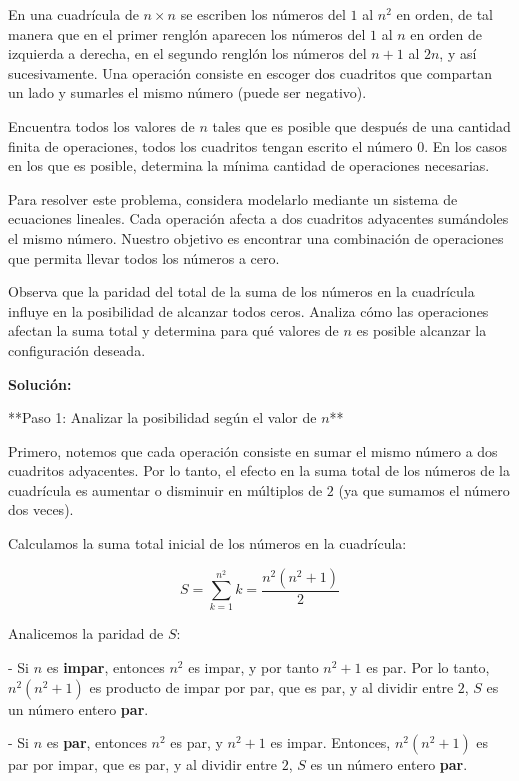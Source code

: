 \documentclass[11pt]{scrartcl}
\begin{document}
\begin{problem}
En una cuadrícula de $n \times n$ se escriben los números del $1$ al $n^2$ en orden, de tal manera que en el primer renglón aparecen los números del $1$ al $n$ en orden de izquierda a derecha, en el segundo renglón los números del $n+1$ al $2n$, y así sucesivamente. Una operación consiste en escoger dos cuadritos que compartan un lado y sumarles el mismo número (puede ser negativo). 

Encuentra todos los valores de $n$ tales que es posible que después de una cantidad finita de operaciones, todos los cuadritos tengan escrito el número 0. En los casos en los que es posible, determina la mínima cantidad de operaciones necesarias.

\begin{hint}
Para resolver este problema, considera modelarlo mediante un sistema de ecuaciones lineales. Cada operación afecta a dos cuadritos adyacentes sumándoles el mismo número. Nuestro objetivo es encontrar una combinación de operaciones que permita llevar todos los números a cero.

Observa que la paridad del total de la suma de los números en la cuadrícula influye en la posibilidad de alcanzar todos ceros. Analiza cómo las operaciones afectan la suma total y determina para qué valores de $n$ es posible alcanzar la configuración deseada.

\begin{solu}
\textbf{Solución:}

**Paso 1: Analizar la posibilidad según el valor de $n$**

Primero, notemos que cada operación consiste en sumar el mismo número a dos cuadritos adyacentes. Por lo tanto, el efecto en la suma total de los números de la cuadrícula es aumentar o disminuir en múltiplos de $2$ (ya que sumamos el número dos veces).

Calculamos la suma total inicial de los números en la cuadrícula:

$$
S = \sum_{k=1}^{n^2} k = \frac{n^2(n^2 + 1)}{2}
$$

Analicemos la paridad de $S$:

- Si $n$ es \textbf{impar}, entonces $n^2$ es impar, y por tanto $n^2 + 1$ es par. Por lo tanto, $n^2(n^2 + 1)$ es producto de impar por par, que es par, y al dividir entre $2$, $S$ es un número entero \textbf{par}.

- Si $n$ es \textbf{par}, entonces $n^2$ es par, y $n^2 + 1$ es impar. Entonces, $n^2(n^2 + 1)$ es par por impar, que es par, y al dividir entre $2$, $S$ es un número entero \textbf{par}.


\end{solu}
\end{hint}
\end{problem}
\end{document}
